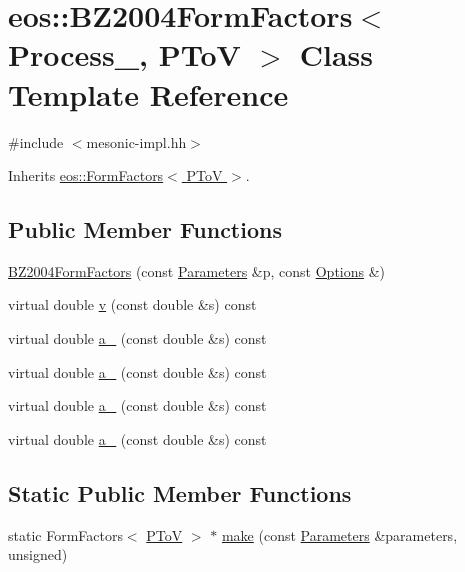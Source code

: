 \hypertarget{classeos_1_1BZ2004FormFactors_3_01Process___00_01PToV_01_4}{
\section{eos::BZ2004FormFactors$<$ Process\_\-, PToV $>$ Class Template Reference}
\label{classeos_1_1BZ2004FormFactors_3_01Process___00_01PToV_01_4}
}


{\ttfamily \#include $<$mesonic-\/impl.hh$>$}

Inherits \hyperlink{classeos_1_1FormFactors_3_01PToV_01_4}{eos::FormFactors$<$ PToV $>$}.\subsection*{Public Member Functions}
\begin{DoxyCompactItemize}
\item 
\hyperlink{classeos_1_1BZ2004FormFactors_3_01Process___00_01PToV_01_4_a225d97783a8fd060a4c031f5217992cf}{BZ2004FormFactors} (const \hyperlink{classeos_1_1Parameters}{Parameters} \&p, const \hyperlink{classeos_1_1Options}{Options} \&)
\item 
virtual double \hyperlink{classeos_1_1BZ2004FormFactors_3_01Process___00_01PToV_01_4_abcc23f51780966652892e0afa138ac3d}{v} (const double \&s) const 
\item 
virtual double \hyperlink{classeos_1_1BZ2004FormFactors_3_01Process___00_01PToV_01_4_a67cc70f2263f1dfec23057c36060ef22}{a\_} (const double \&s) const 
\item 
virtual double \hyperlink{classeos_1_1BZ2004FormFactors_3_01Process___00_01PToV_01_4_a790c3bda390cd45e32f9d99daf3d87e0}{a\_} (const double \&s) const 
\item 
virtual double \hyperlink{classeos_1_1BZ2004FormFactors_3_01Process___00_01PToV_01_4_a772daa575ec65cac187fc0ec34364ddd}{a\_} (const double \&s) const 
\item 
virtual double \hyperlink{classeos_1_1BZ2004FormFactors_3_01Process___00_01PToV_01_4_a2a5dd7b8b48e71efd26489622a10ed7f}{a\_} (const double \&s) const 
\end{DoxyCompactItemize}
\subsection*{Static Public Member Functions}
\begin{DoxyCompactItemize}
\item 
static FormFactors$<$ \hyperlink{structeos_1_1PToV}{PToV} $>$ $\ast$ \hyperlink{classeos_1_1BZ2004FormFactors_3_01Process___00_01PToV_01_4_a9311fe960a5c12827dc75231db7de93f}{make} (const \hyperlink{classeos_1_1Parameters}{Parameters} \&parameters, unsigned)
\end{DoxyCompactItemize}

